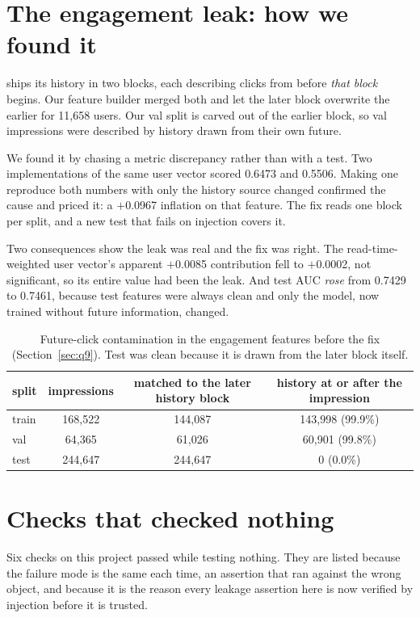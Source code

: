 \section{The engagement leak: how we found it}
\label{app:leak}

\eb{} ships its history in two blocks, each describing clicks from before \emph{that block}
begins. Our feature builder merged both and let the later block overwrite the earlier for 11,658
users. Our val split is carved out of the earlier block, so val impressions were described by
history drawn from their own future.

We found it by chasing a metric discrepancy rather than with a test. Two implementations of the
same user vector scored 0.6473 and 0.5506. Making one reproduce both numbers with only the history
source changed confirmed the cause and priced it: a $+$0.0967 inflation on that feature. The fix
reads one block per split, and a new test that fails on injection covers it.

Two consequences show the leak was real and the fix was right. The read-time-weighted user
vector's apparent $+$0.0085 contribution fell to $+$0.0002, not significant, so its entire value
had been the leak. And test AUC \emph{rose} from 0.7429 to 0.7461, because test features were
always clean and only the model, now trained without future information, changed.

\begin{table}[t]
\centering\small
\begin{tabular}{@{}lccc@{}}
\toprule
split & impressions & matched to the later history block & history at or after the impression \\
\midrule
train & 168,522 & 144,087 & 143,998 (99.9\%) \\
val & 64,365 & 61,026 & 60,901 (99.8\%) \\
test & 244,647 & 244,647 & 0 (0.0\%) \\
\bottomrule
\end{tabular}
\caption{Future-click contamination in the engagement features before the fix
(Section~\ref{sec:q9}). Test was clean because it is drawn from the later block itself.}
\label{tab:leak}
\end{table}

\section{Checks that checked nothing}
\label{app:vacuous}

Six checks on this project passed while testing nothing. They are listed because the failure mode
is the same each time, an assertion that ran against the wrong object, and because it is the
reason every leakage assertion here is now verified by injection before it is trusted.


